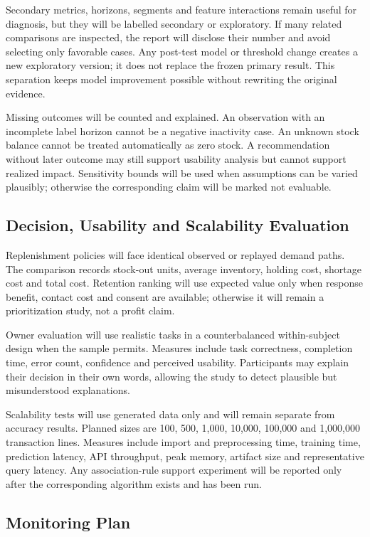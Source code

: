Secondary metrics, horizons, segments and feature interactions remain useful
for diagnosis, but they will be labelled secondary or exploratory. If many
related comparisons are inspected, the report will disclose their number and
avoid selecting only favorable cases. Any post-test model or threshold change
creates a new exploratory version; it does not replace the frozen primary
result. This separation keeps model improvement possible without rewriting the
original evidence.

Missing outcomes will be counted and explained. An observation with an
incomplete label horizon cannot be a negative inactivity case. An unknown stock
balance cannot be treated automatically as zero stock. A recommendation without
later outcome may still support usability analysis but cannot support realized
impact. Sensitivity bounds will be used when assumptions can be varied
plausibly; otherwise the corresponding claim will be marked not evaluable.

\subsection{Decision, Usability and Scalability Evaluation}

Replenishment policies will face identical observed or replayed demand paths.
The comparison records stock-out units, average inventory, holding cost,
shortage cost and total cost. Retention ranking will use expected value only
when response benefit, contact cost and consent are available; otherwise it will
remain a prioritization study, not a profit claim.

Owner evaluation will use realistic tasks in a counterbalanced within-subject
design when the sample permits. Measures include task correctness, completion
time, error count, confidence and perceived usability. Participants may explain
their decision in their own words, allowing the study to detect plausible but
misunderstood explanations.

Scalability tests will use generated data only and will remain separate from
accuracy results. Planned sizes are 100, 500, 1,000, 10,000, 100,000 and
1,000,000 transaction lines. Measures include import and preprocessing time,
training time, prediction latency, API throughput, peak memory, artifact size
and representative query latency. Any association-rule support experiment will
be reported only after the corresponding algorithm exists and has been run.

\subsection{Monitoring Plan}

